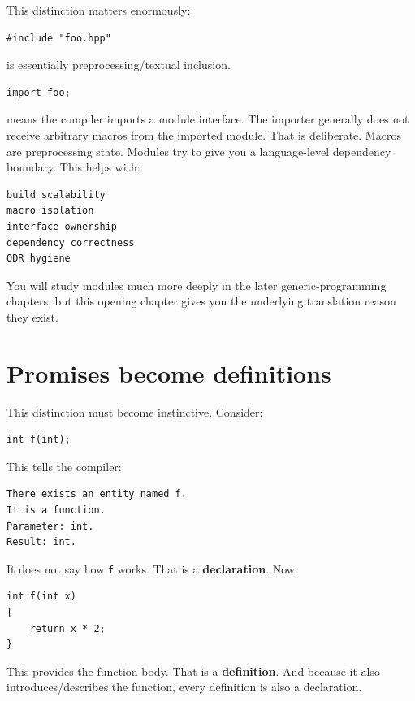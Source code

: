 This distinction matters enormously:

\begin{verbatim}
#include "foo.hpp"
\end{verbatim}

is essentially preprocessing/textual inclusion.

\begin{verbatim}
import foo;
\end{verbatim}

means the compiler imports a module interface. The importer generally does not receive arbitrary macros from the imported module. That is deliberate. Macros are preprocessing state. Modules try to give you a language-level dependency boundary. This helps with:

\begin{verbatim}
build scalability
macro isolation
interface ownership
dependency correctness
ODR hygiene
\end{verbatim}

You will study modules much more deeply in the later generic-programming chapters, but this opening chapter gives you the underlying translation reason they exist.

\section{Promises become definitions}\label{01-foundations-i-ch002-promises-become-definitions}

This distinction must become instinctive. Consider:

\begin{verbatim}
int f(int);
\end{verbatim}

This tells the compiler:

\begin{verbatim}
There exists an entity named f.
It is a function.
Parameter: int.
Result: int.
\end{verbatim}

It does not say how \texttt{f} works. That is a \textbf{declaration}. Now:

\begin{verbatim}
int f(int x)
{
    return x * 2;
}
\end{verbatim}

This provides the function body. That is a \textbf{definition}. And because it also introduces/describes the function, every definition is also a declaration.

